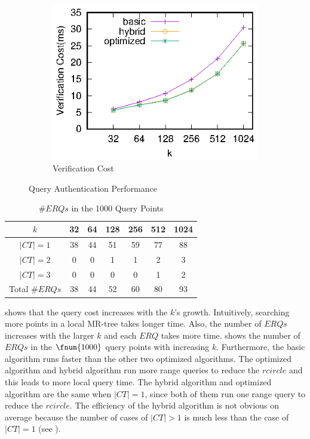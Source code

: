 \begin{figure}[t]
\begin{subfigure}[t]{.33\linewidth}
    \includegraphics[width=\linewidth]{exp-figs/knn/verify.eps}
    \caption{Verification Cost}\label{fig:knn:query:verify}
  \end{subfigure}
  \caption{Query Authentication Performance}\label{fig:knn:query}
\end{figure}

\begin{table}[t]
  \centering
  \begin{tabular}{ccccccc}
    \toprule
    $k$         & 32 & 64 & 128 & 256 & 512 & 1024 \\
    \midrule
    $|CT|=1$    & 38 & 44 & 51  & 59  & 77  & 88   \\
    $|CT|=2$    & 0  & 0  & 1   & 1   & 2   & 3    \\
    $|CT|=3$   & 0  & 0  & 0   & 0   & 1   & 2    \\
    Total $\# ERQs$ & 38 & 44 & 52  & 60  & 80  & 93   \\
    \bottomrule
  \end{tabular}
  \caption{$\# ERQs$ in the 1000 Query Points}\label{tab:knn:num-erq}
\end{table}

 shows that the query cost increases with the $k$'s growth. Intuitively, searching more points in a local MR-tree takes longer time. Also, the number of $ERQs$ increases with the larger $k$ and each $ERQ$ takes more time.  shows the number of $ERQs$ in the $\fnum{1000}$ query points with increasing $k$. Furthermore, the basic algorithm runs faster than the other two optimized algorithms. The optimized algorithm and hybrid algorithm run more range queries to reduce the $rcircle$ and this leads to more local query time. The hybrid algorithm and optimized algorithm are the same when $|CT|=1$, since both of them run one range query to reduce the $rcircle$. The efficiency of the hybrid algorithm is not obvious on average because the number of cases of $|CT|>1$ is much less than the case of $|CT|=1$ (see ).

